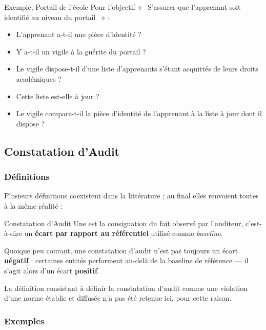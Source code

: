 \begin{boxlizbiz}{Exemple, Portail de l'école}
Pour l'objectif «~ S'assurer que l'apprenant soit identifié au niveau du portail ~»{} :
\begin{itemize}
  \item L'apprenant a-t-il une pièce d'identité ?
  \item Y a-t-il un vigile à la guérite du portail ?
  \item Le vigile dispose-t-il d'une liste d'apprenants s'étant acquittés de leurs droits
    académiques ?
  \item Cette liste est-elle à jour ?
  \item Le vigile compare-t-il la pièce d'identité de l'apprenant à la liste à jour dont
    il dispose ?
\end{itemize}
\end{boxlizbiz}

\subsection{Constatation d'Audit}

\subsubsection{Définitions}

Plusieurs définitions coexistent dans la littérature ; au final elles renvoient toutes
à la même réalité :

\begin{boxdef}{Constatation d'Audit}
Une  est la consignation du fait observé par l'auditeur,
c'est-à-dire un \textbf{écart par rapport au référentiel} utilisé comme
\textit{baseline}.

Quoique peu courant, une constatation d'audit n'est pas toujours un écart
\textbf{négatif} : certaines entités performent au-delà de la baseline de référence —
il s'agit alors d'un écart \textbf{positif}.
\end{boxdef}

La définition consistant à définir la constatation d'audit comme une violation d'une
norme établie et diffusée n'a pas été retenue ici, pour cette raison.

\subsubsection{Exemples}

